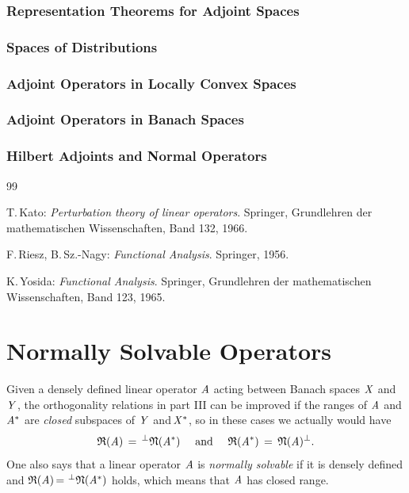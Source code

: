\documentclass[11pt,twoside]{article}
\begin{document}
\section{Representation Theorems for Adjoint Spaces}
\section{Spaces of Distributions}
\section{Adjoint Operators in Locally Convex Spaces}
\section{Adjoint Operators in Banach Spaces}
\section{Hilbert Adjoints and Normal Operators}

\vspace{5mm}
\begin{thebibliography}{99}
\begin{small}

 T.\,Kato:
\textit{{Perturbation theory of linear operators}}.
Springer, Grund\-lehren der mathematischen Wissenschaften, Band 132, 1966.

 F.\,Riesz, B.\,Sz.-Nagy:
\textit{{Functional Analysis}}.
Springer, 1956.

 K.\,Yosida:
\textit{Functional Analysis}.
Springer, Grund\-lehren der mathematischen Wissenschaften, Band 123, 1965.

\end{small}
\end{thebibliography}

\newpage
\thispagestyle{empty}
\part{Normally Solvable Operators}                                             %
Given a densely defined linear operator $\mathit{A}$ acting between Banach spaces
$\mathit{X}$ and\,$\mathit{Y}$,
the orthogonality relations in part III can be improved
if the ranges of $\mathit{A}$ and $\mathit{A}^*$ are \textit{closed} subspaces
of $\mathit{Y}$ and\,$\mathit{X}^*$,
so in these cases we actually would have
\begin{equation}\label{V_ORTHOGONALITY_RELATIONS}
{\mathfrak{R}(\mathit{A}) } \,=\, ^{\bot}\mathfrak{N}(\mathit{A}^*)
\quad \mbox{ and } \quad
{\mathfrak{R}(\mathit{A}^*) } \,=\, \mathfrak{N}(\mathit{A})^{\bot}.
\end{equation}
One also says that
a linear operator $\mathit{A}$ is \textit{normally solvable}
if it is densely defined and
$\mathfrak{R}(\mathit{A}) {\,=\,} \, ^{\bot}\mathfrak{N}(\mathit{A}^*)$ holds,
which means that $\mathit{A}$ has closed range.
\end{document}
